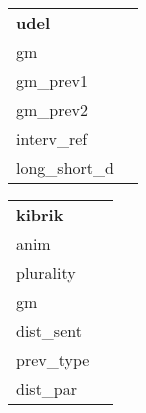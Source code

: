 \begin{table}[htbp]
{\begin{tabular}{|l|l}
		\end{tabular}
	}
	\parbox{.15\linewidth}{
		\centering
		\begin{tabular}{|l|l}
			\cline{1-1}
			\textbf{udel}        &  \\ \cline{1-1}
			gm         &  \\ \cline{1-1}
			gm\_prev1         &  \\ \cline{1-1}
			gm\_prev2         &  \\ \cline{1-1}
			interv\_ref         &  \\ \cline{1-1}
			long\_short\_d         &  \\ \cline{1-1}
			
		\end{tabular}

	}
		\parbox{.15\linewidth}{
		\centering
		\begin{tabular}{|l|l}
			\cline{1-1}
			\textbf{kibrik}        &  \\ \cline{1-1}
			anim         &  \\ \cline{1-1}
			plurality         &  \\ \cline{1-1}
			gm         &  \\ \cline{1-1}
			dist\_sent         &  \\ \cline{1-1}
			prev\_type         &  \\ \cline{1-1}
			dist\_par         &  \\ \cline{1-1}
			
		\end{tabular}

	}
	
\end{table}